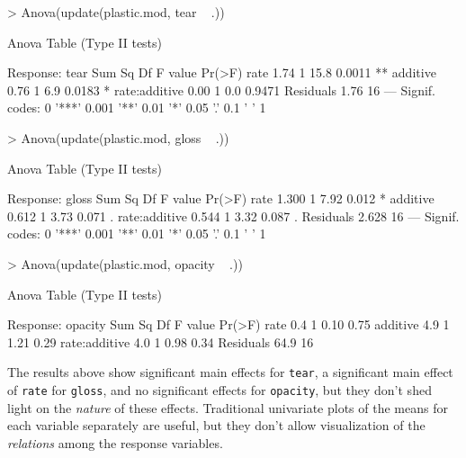\documentclass[11pt]{article}
\newcommand{\code}[1]{{\texttt{#1}}}
\begin{document}
\begin{Schunk}
\begin{Sinput}
> Anova(update(plastic.mod, tear ~ .))
\end{Sinput}
\begin{Soutput}
Anova Table (Type II tests)

Response: tear
              Sum Sq Df F value Pr(>F)   
rate            1.74  1    15.8 0.0011 **
additive        0.76  1     6.9 0.0183 * 
rate:additive   0.00  1     0.0 0.9471   
Residuals       1.76 16                  
---
Signif. codes:  0 '***' 0.001 '**' 0.01 '*' 0.05 '.' 0.1 ' ' 1 
\end{Soutput}
\begin{Sinput}
> Anova(update(plastic.mod, gloss ~ .))
\end{Sinput}
\begin{Soutput}
Anova Table (Type II tests)

Response: gloss
              Sum Sq Df F value Pr(>F)  
rate           1.300  1    7.92  0.012 *
additive       0.612  1    3.73  0.071 .
rate:additive  0.544  1    3.32  0.087 .
Residuals      2.628 16                 
---
Signif. codes:  0 '***' 0.001 '**' 0.01 '*' 0.05 '.' 0.1 ' ' 1 
\end{Soutput}
\begin{Sinput}
> Anova(update(plastic.mod, opacity ~ .))
\end{Sinput}
\begin{Soutput}
Anova Table (Type II tests)

Response: opacity
              Sum Sq Df F value Pr(>F)
rate             0.4  1    0.10   0.75
additive         4.9  1    1.21   0.29
rate:additive    4.0  1    0.98   0.34
Residuals       64.9 16               
\end{Soutput}
\end{Schunk}
The results above show significant main effects for \code{tear},
a significant main effect of \code{rate} for \code{gloss},
and no significant effects for \code{opacity}, but they don't shed light on the
\emph{nature} of these effects.
Traditional univariate plots of the means for each variable separately
are useful, but they don't allow visualization of the
\emph{relations} among the response variables.
\end{document}
